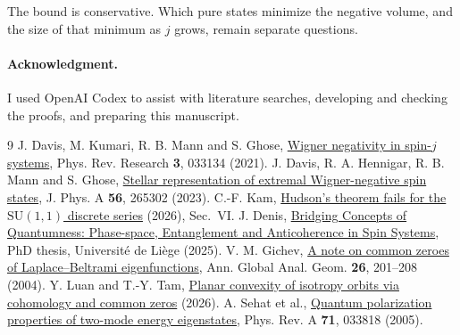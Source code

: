 \documentclass[10pt,a4paper]{article}
\newcommand{\SU}{\mathrm{SU}}
\begin{document}
The bound is conservative. Which pure states minimize the negative volume, and the size of that minimum as \(j\) grows, remain separate questions.

\paragraph{Acknowledgment.} I used OpenAI Codex to assist with literature searches, developing and checking the proofs, and preparing this manuscript.

\small
\begin{thebibliography}{9}
 J. Davis, M. Kumari, R. B. Mann and S. Ghose, \href{https://doi.org/10.1103/PhysRevResearch.3.033134}{Wigner negativity in spin-\(j\) systems}, Phys. Rev. Research \textbf{3}, 033134 (2021).
 J. Davis, R. A. Hennigar, R. B. Mann and S. Ghose, \href{https://arxiv.org/abs/2206.00195}{Stellar representation of extremal Wigner-negative spin states}, J. Phys. A \textbf{56}, 265302 (2023).
 C.-F. Kam, \href{https://arxiv.org/abs/2609.07242}{Hudson's theorem fails for the \(\SU(1,1)\) discrete series} (2026), Sec.~VI.
 J. Denis, \href{https://orbi.uliege.be/handle/2268/336540}{Bridging Concepts of Quantumness: Phase-space, Entanglement and Anticoherence in Spin Systems}, PhD thesis, Universit\'e de Li\`ege (2025).
 V. M. Gichev, \href{https://arxiv.org/abs/math/0511688}{A note on common zeroes of Laplace--Beltrami eigenfunctions}, Ann. Global Anal. Geom. \textbf{26}, 201--208 (2004).
 Y. Luan and T.-Y. Tam, \href{https://arxiv.org/abs/2611.02575}{Planar convexity of isotropy orbits via cohomology and common zeros} (2026).
 A. Sehat et al., \href{https://doi.org/10.1103/PhysRevA.71.033818}{Quantum polarization properties of two-mode energy eigenstates}, Phys. Rev. A \textbf{71}, 033818 (2005).
\end{thebibliography}
\end{document}
